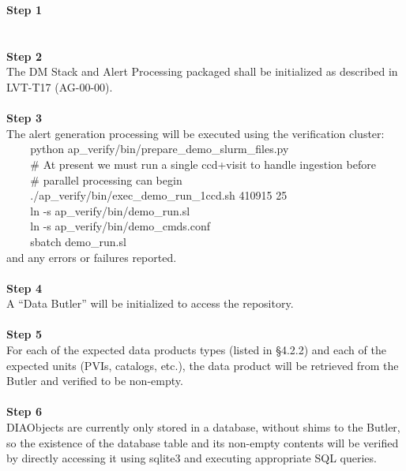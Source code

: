 \textbf{Step 1}\\
~\\
~\\
\textbf{Step 2}\\
The DM Stack and Alert Processing packaged shall be initialized as
described in LVT-T17 (AG-00-00).\\
~\\
\textbf{Step 3}\\
The alert generation processing will be executed using the verification
cluster:\\
\hspace*{0.333em} ~ ~ ~python
ap\_verify/bin/prepare\_demo\_slurm\_files.py\\
\hspace*{0.333em} ~ ~ ~\# At present we must run a single ccd+visit to
handle ingestion before\\
\hspace*{0.333em} ~ ~ ~\# parallel processing can begin\\
\hspace*{0.333em} ~ ~ ~./ap\_verify/bin/exec\_demo\_run\_1ccd.sh 410915
25\\
\hspace*{0.333em} ~ ~ ~ln -s ap\_verify/bin/demo\_run.sl\\
\hspace*{0.333em} ~ ~ ~ln -s ap\_verify/bin/demo\_cmds.conf\\
\hspace*{0.333em} ~ ~ ~sbatch demo\_run.sl\\
and any errors or failures reported.\\
~\\
\textbf{Step 4}\\
A ``Data Butler'' will be initialized to access the repository.\\
~\\
\textbf{Step 5}\\
For each of the expected data products types (listed in §4.2.2) and each
of the expected units (PVIs, catalogs, etc.), the data product will be
retrieved from the Butler and verified to be non-empty.\\
~\\
\textbf{Step 6}\\
DIAObjects are currently only stored in a database, without shims to the
Butler, so the existence of the database table and its non-empty
contents will be verified by directly accessing it using sqlite3 and
executing appropriate SQL queries.\\
~\\

